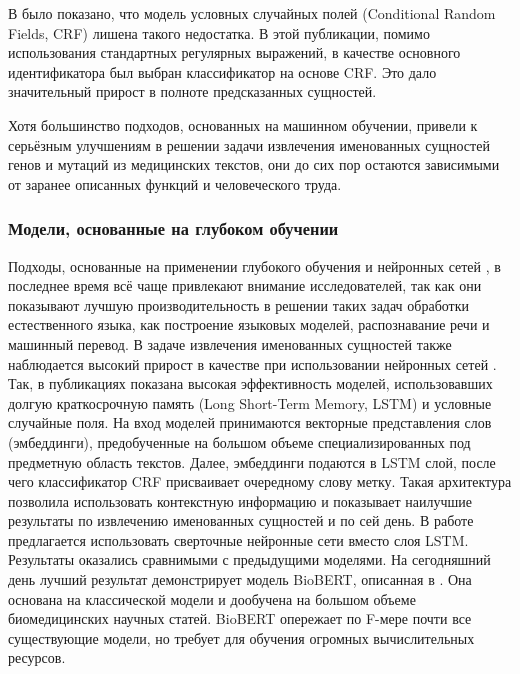 \documentclass[12pt, a4paper]{article} %
\begin{document}
В \cite{pmid23564842} было показано, что модель условных случайных полей (Conditional Random Fields, CRF) лишена такого недостатка. В этой публикации, помимо использования стандартных регулярных выражений, в качестве основного идентификатора был выбран классификатор на основе CRF. Это дало значительный прирост в полноте предсказанных сущностей. 

\bigskip

Хотя большинство подходов, основанных на машинном обучении, привели к серьёзным улучшениям в решении задачи извлечения именованных сущностей генов и мутаций из медицинских текстов, они до сих пор остаются зависимыми от заранее описанных функций и человеческого труда.

\subsubsection{Модели, основанные на глубоком обучении}
Подходы, основанные на применении глубокого обучения и нейронных сетей \cite{DBLP:journals/corr/LampleBSKD16}, в последнее время всё чаще привлекают внимание исследователей, так как они показывают лучшую производительность в решении таких задач обработки естественного языка, как построение языковых моделей, распознавание речи и машинный перевод. В задаче извлечения именованных сущностей также наблюдается высокий прирост в качестве при использовании нейронных сетей \cite{DBLP:journals/corr/LampleBSKD16}. Так, в публикациях \cite{pmid32046638, Habibi2017, Yoon2019, Weber2019} показана высокая эффективность моделей, использовавших долгую краткосрочную память (Long Short-Term Memory, LSTM) \cite{Hochreiter1997} и условные случайные поля. На вход моделей принимаются векторные представления слов (эмбеддинги), предобученные на большом объеме специализированных под предметную область текстов. Далее, эмбеддинги подаются в LSTM слой, после чего классификатор CRF присваивает очередному слову метку. Такая архитектура позволила использовать контекстную информацию и показывает наилучшие результаты по извлечению именованных сущностей и по сей день. В работе \cite{Zhu2018} предлагается использовать сверточные нейронные сети вместо слоя LSTM. Результаты оказались сравнимыми с предыдущими моделями. На сегодняшний день лучший результат демонстрирует модель BioBERT, описанная в \cite{Lee2019}. Она основана на классической модели \cite{Devlin2019} и дообучена на большом объеме биомедицинских научных статей. BioBERT опережает по F-мере почти все существующие модели, но требует для обучения огромных вычислительных ресурсов. 
\end{document}
